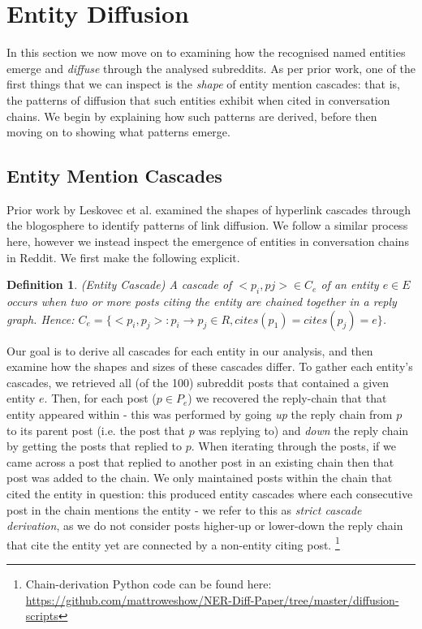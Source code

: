 \documentclass[10pt,journal,compsoc]{IEEEtran}
\newtheorem{mydef}{Definition}
\begin{document}
\section{Entity Diffusion}
\label{sec:diffusion}
In this section we now move on to examining how the recognised named entities emerge and \emph{diffuse} through the analysed subreddits.
As per prior work, one of the first things that we can inspect is the \emph{shape} of entity mention cascades: that is, the patterns of diffusion that such entities exhibit when cited in conversation chains. 
We begin by explaining how such patterns are derived, before then moving on to showing what patterns emerge.

\subsection{Entity Mention Cascades}
Prior work by Leskovec et al. \cite{leskovec2007patterns} examined the shapes of hyperlink cascades through the blogosphere to identify patterns of link diffusion.
We follow a similar process here, however we instead inspect the emergence of entities in conversation chains in Reddit.
We first make the following explicit.

\begin{mydef}
(Entity Cascade) A cascade of ${<p_i, pj>} \in C_e$ of an entity $e \in E$ occurs when two or more posts citing the entity are chained together in a reply graph. 
Hence: $C_e = \{<p_i, p_j> : p_i \rightarrow p_j \in R, cites(p_1) = cites(p_j) = e\}$.
\end{mydef}

Our goal is to derive all cascades for each entity in our analysis, and then examine how the shapes and sizes of these cascades differ.
To gather each entity's cascades, we retrieved all (of the 100) subreddit posts that contained a given entity $e$.
Then, for each post ($p \in P_e$) we recovered the reply-chain that that entity appeared within - this was performed by going \emph{up} the reply chain from $p$ to its parent post (i.e. the post that $p$ was replying to) and \emph{down} the reply chain by getting the posts that replied to $p$.
When iterating through the posts, if we came across a post that replied to another post in an existing chain then that post was added to the chain.
We only maintained posts within the chain that cited the entity in question: this produced entity cascades where each consecutive post in the chain mentions the entity - we refer to this as \emph{strict cascade derivation}, as we do not consider posts higher-up or lower-down the reply chain that cite the entity yet are connected by a non-entity citing post. \footnote{Chain-derivation Python code can be found here: \url{https://github.com/mattroweshow/NER-Diff-Paper/tree/master/diffusion-scripts}}
\end{document}
